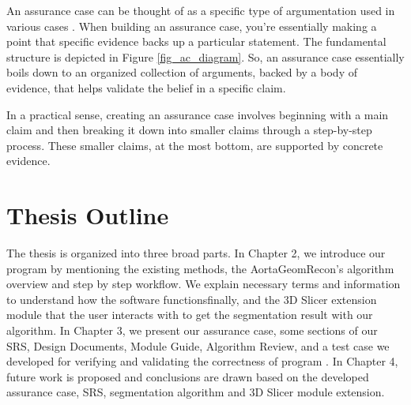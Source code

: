 An assurance case can be thought of as a specific type of argumentation used in various cases \cite{doi:10.2514/6.2009-1921}. When building an assurance case, you're essentially making a point that specific evidence backs up a particular statement. The fundamental structure is depicted in Figure \ref{fig_ac_diagram}. So, an assurance case essentially boils down to an organized collection of arguments, backed by a body of evidence, that helps validate the belief in a specific claim.

In a practical sense, creating an assurance case involves beginning with a main claim and then breaking it down into smaller claims through a step-by-step process. These smaller claims, at the most bottom, are supported by concrete evidence.


\section{Thesis Outline} \label{TO}

The thesis is organized into three broad parts. In Chapter 2, we introduce our program \progname{} by mentioning the existing methods, the AortaGeomRecon's algorithm overview and step by step  workflow. We explain necessary terms and information to understand how the software functionsfinally, and the 3D Slicer \cite{Kikinis2014} extension module that the user interacts with to get the segmentation result with our algorithm. In Chapter 3, we present our assurance case, some sections of our SRS, Design Documents, Module Guide, Algorithm Review, and a test case we developed for verifying and validating the correctness of program \progname{}. In Chapter 4, future work is proposed and conclusions are drawn based on the developed assurance case, SRS, segmentation algorithm and 3D Slicer module extension.